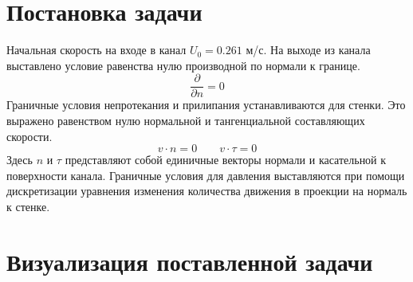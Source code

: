 \section{Постановка задачи}
	Начальная скорость на входе в канал $U_0 = 0.261$ м/с.
	На выходе из канала выставлено условие равенства нулю производной по нормали к границе.
	\begin{equation}
		\frac{\partial}{\partial n} = 0
	\end{equation}
	Граничные условия непротекания и прилипания устанавливаются для стенки. Это выражено равенством нулю нормальной и тангенциальной составляющих скорости.
	\begin{equation}
		v \cdot n = 0 \qquad v \cdot \tau = 0
	\end{equation}
	Здесь $n$ и $\tau$ представляют собой единичные векторы нормали и касательной к поверхности канала. Граничные условия для давления выставляются при помощи дискретизации уравнения изменения количества движения в проекции на нормаль к стенке.

\section{Визуализация поставленной задачи}
